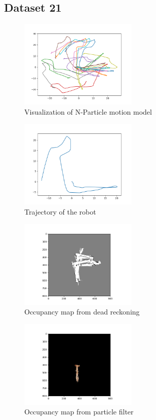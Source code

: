 \documentclass[a4paper]{article}
\begin{document}
\subsection{Dataset 21}
\begin{figure}[h]
    \centering
    \includegraphics[width=0.5\textwidth]{visualization_1.png}
    \caption{Visualization of N-Particle motion model}
    \label{fig:N-Particle trajectory}
\end{figure}
\begin{figure}[h]
    \centering
    \includegraphics[width=0.5\textwidth]{trajectory_1.png}
    \caption{Trajectory of the robot}
    \label{fig:trajectory}
\end{figure}
\begin{figure}[h]
    \centering
    \includegraphics[width=0.5\textwidth]{dead_reckon_1.png}
    \caption{Occupancy map from dead reckoning}
    \label{fig:occupancy_map}
\end{figure}
\begin{figure}[h]
    \centering
    \includegraphics[width=0.5\textwidth]{texture500.png}
    \caption{Occupancy map from particle filter}
    \label{fig:particle_filter}
\end{figure}
\end{document}
